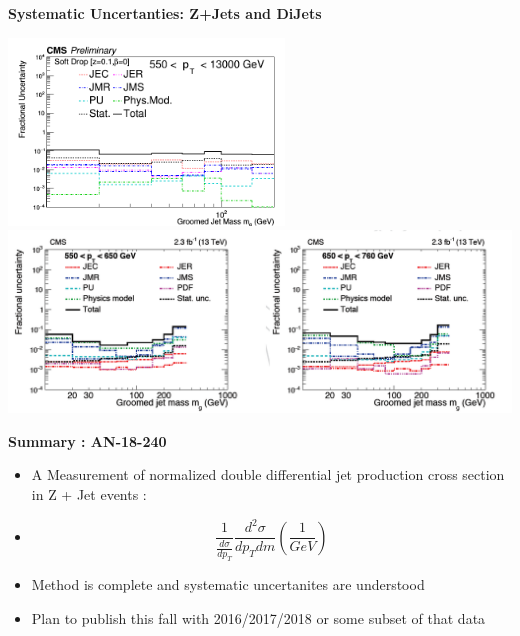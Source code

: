 \documentclass{beamer}
\begin{document}
\begin{frame}{\textbf{Systematic Uncertanties: Z+Jets and DiJets}}


\includegraphics[width=0.55\textwidth]{Oct31_unfoldPlots_sdB0/AllSystematics_FractionofUnfoldedBinContent_ptbin6MC_mass_Ptbin550to13000_Detbinning_Groomingis_sdB0.png}%
\newline
\includegraphics[width=1\textwidth]{dijet550andup.png}
\newline


\end{frame}


\begin{frame}{\textbf{Summary : AN-18-240}}
\vspace{3.5mm}
\begin{itemize}
\item A Measurement of normalized double differential jet production cross section in Z + Jet events :
\item[] $$ \frac{1}{ \frac{d\sigma}{dp_{T}} }   \frac{d^2\sigma}{dp_{T} dm}  (\frac{1}{GeV})  $$

\item Method is complete and systematic uncertanites are understood
\item Plan to publish this fall with 2016/2017/2018 or some subset of that data




\end{itemize}
\end{frame}
\end{document}
